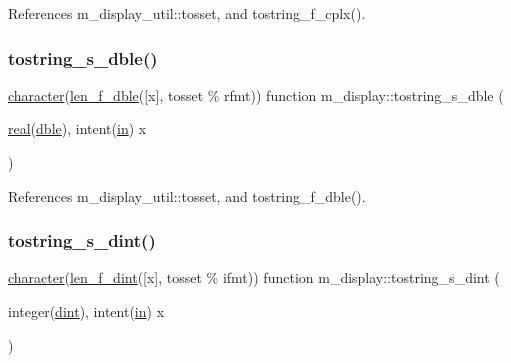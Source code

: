 References m\+\_\+display\+\_\+util\+::tosset, and tostring\+\_\+f\+\_\+cplx().

\mbox{\label{namespacem__display_ac0c020f1b9556f123bfea3ff29cda048}} 
\subsubsection{\texorpdfstring{tostring\+\_\+s\+\_\+dble()}{tostring\_s\_dble()}}
{\footnotesize\ttfamily \hyperlink{option__stopwatch_83_8txt_abd4b21fbbd175834027b5224bfe97e66}{character}(\hyperlink{namespacem__display_aa013a639d5b0f7e40b627c9d712693f0}{len\+\_\+f\+\_\+dble}(\mbox{[}x\mbox{]}, tosset \% rfmt)) function m\+\_\+display\+::tostring\+\_\+s\+\_\+dble (\begin{DoxyParamCaption}\item[{\hyperlink{read__watch_83_8txt_abdb62bde002f38ef75f810d3a905a823}{real}(\hyperlink{namespacem__display_a46d90b75b6ccef7ccade133e5847e815}{dble}), intent(\hyperlink{M__journal_83_8txt_afce72651d1eed785a2132bee863b2f38}{in})}]{x }\end{DoxyParamCaption})\hspace{0.3cm}{\ttfamily [private]}}



References m\+\_\+display\+\_\+util\+::tosset, and tostring\+\_\+f\+\_\+dble().

\mbox{\label{namespacem__display_a5bfeb905fb5036068ef0012eb2f563fa}} 
\subsubsection{\texorpdfstring{tostring\+\_\+s\+\_\+dint()}{tostring\_s\_dint()}}
{\footnotesize\ttfamily \hyperlink{option__stopwatch_83_8txt_abd4b21fbbd175834027b5224bfe97e66}{character}(\hyperlink{namespacem__display_a6a2709cf5f243ee492f223b40c6b5143}{len\+\_\+f\+\_\+dint}(\mbox{[}x\mbox{]}, tosset \% ifmt)) function m\+\_\+display\+::tostring\+\_\+s\+\_\+dint (\begin{DoxyParamCaption}\item[{integer(\hyperlink{namespacem__display_a73f772e9702cad6f40b78364fde2c7cd}{dint}), intent(\hyperlink{M__journal_83_8txt_afce72651d1eed785a2132bee863b2f38}{in})}]{x }\end{DoxyParamCaption})\hspace{0.3cm}{\ttfamily [private]}}



